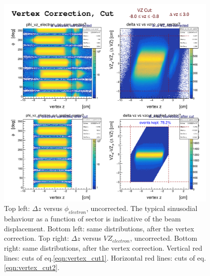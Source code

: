\begin{figure}[h]
	\centering
		\includegraphics[width=0.96\textwidth ]{img/vtx_2D_all_sector.png}
			\caption{Top left: $\Delta z$ versus $\phi_{electron}$, uncorrected.
						The typical sinusodial behaviour as a function of sector is
						indicative of the beam displacement. Bottom left: same 
						distributions, after the vertex correction. 
						Top right:  $\Delta z$ versus $VZ_{electron}$, uncorrected. Bottom
						right: same distributions, after the vertex correction.
						Vertical red lines: cuts of eq.\ref{eqn:vertex_cut1}.
						Horizontal red lines: cuts of eq.\ref{eqn:vertex_cut2}.}
			\label{fig:vertex_corr_2D}
\end{figure}










